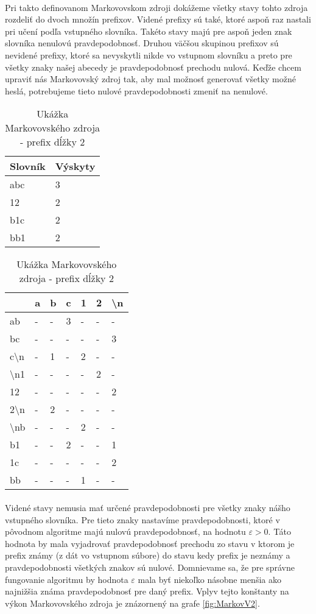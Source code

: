 \paragraph{}
Pri takto definovanom Markovovskom zdroji dokážeme všetky stavy tohto zdroja rozdeliť do dvoch množín prefixov. Videné prefixy sú také, ktoré aspoň raz nastali pri učení podľa vstupného slovníka. Takéto stavy majú pre aspoň jeden znak slovníka nenulovú pravdepodobnosť. Druhou väčšou skupinou prefixov sú nevidené prefixy, ktoré sa nevyskytli nikde vo vstupnom slovníku a preto pre všetky znaky našej abecedy je pravdepodobnosť prechodu nulová. Keďže chcem upraviť nás Markovovský zdroj tak, aby mal možnosť generovať všetky možné heslá, potrebujeme tieto nulové pravdepodobnosti zmeniť na nenulové. 

\begin{table}[]
\centering
\caption{Ukážka Markovovského zdroja - prefix dĺžky 2}
\label{tbl:MarkovZdroj}
\begin{tabular}{ll}
Slovník & Výskyty\\ \hline
abc & 3 \\
12 & 2 \\
b1c & 2 \\
bb1 & 2
\end{tabular}
\quad
\begin{tabular}{l|llllll}
	& a & b & c & 1 & 2 & \textbackslash{}n \\ \hline
ab 	& -	& - & 3 & - & - & - \\
bc 	& - & - & - & - & - & 3 \\
c\textbackslash{}n & - & 1 & - & 2 & - & - \\
\textbackslash{}n1 & - & - & - & - & 2 & - \\
12 & - & - & - & - & - & 2 \\
2\textbackslash{}n & - & 2 & - & - & - & - \\
\textbackslash{}nb & - & - & - & 2 & - & - \\
b1 & - & - & 2 & - & - & 1\\
1c & - & - & - & - & - & 2 \\
bb & - & - & - & 1 & - & -
\end{tabular}
\end{table}

\paragraph{}
Videné stavy nemusia mať určené pravdepodobnosti pre všetky znaky nášho vstupného slovníka. Pre tieto znaky nastavíme pravdepodobnosti, ktoré v pôvodnom algoritme majú nulovú pravdepodobnosť, na hodnotu \(\varepsilon > 0\). Táto hodnota by mala vyjadrovať pravdepodobnosť prechodu zo stavu v ktorom je prefix známy (z dát vo vstupnom súbore) do stavu kedy prefix je neznámy a pravdepodobnosti všetkých znakov sú nulové. Domnievame sa, že pre správne fungovanie algoritmu by hodnota \(\varepsilon\) mala byť niekoľko násobne menšia ako najnižšia známa pravdepodobnosť pre daný prefix. Vplyv tejto konštanty na výkon Markovovského zdroja je znázornený na grafe \ref{fig:MarkovV2}.

